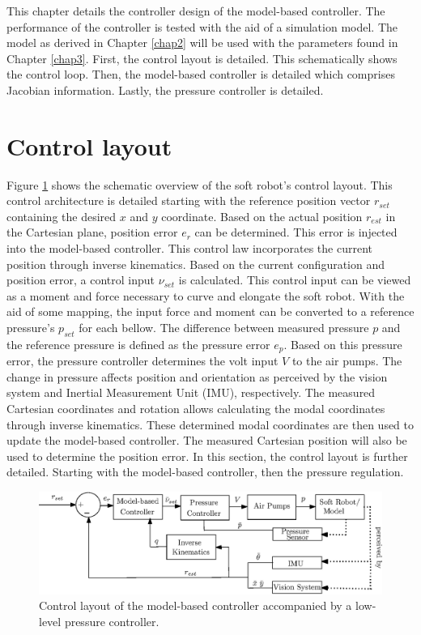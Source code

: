 \label{chap4}

This chapter details the controller design of the model-based controller. The performance of the controller is tested with the aid of a simulation model. The model as derived in Chapter \ref{chap2} will be used with the parameters found in Chapter \ref{chap3}. First, the control layout is detailed. This schematically shows the control loop. Then, the model-based controller is detailed which comprises Jacobian information. Lastly, the pressure controller is detailed. 



\section{Control layout}

Figure \ref{fig4:controllayout} shows the schematic overview of the soft robot's control layout. This control architecture is detailed starting with the reference position vector $r_{set}$ containing the desired $x$ and $y$ coordinate. Based on the actual position $r_{est}$ in the Cartesian plane, position error $e_r$ can be determined. This error is injected into the model-based controller. This control law incorporates the current position through inverse kinematics. Based on the current configuration and position error, a control input $\nu_{set}$ is calculated. This control input can be viewed as a moment and force necessary to curve and elongate the soft robot. With the aid of some mapping, the input force and moment can be converted to a reference pressure's $p_{set}$ for each bellow. The difference between measured pressure $p$ and the reference pressure is defined as the pressure error $e_p$. Based on this pressure error, the pressure controller determines the volt input $V$ to the air pumps. The change in pressure affects position and orientation as perceived by the vision system and Inertial Measurement Unit (IMU), respectively. The measured Cartesian coordinates and rotation allows calculating the modal coordinates through inverse kinematics. These determined modal coordinates are then used to update the model-based controller. The measured Cartesian position will also be used to determine the position error. In this section, the control layout is further detailed. Starting with the model-based controller, then the pressure regulation.


\begin{figure}[H]
    \centering
    \includegraphics[width = \textwidth]{Figures/Chapter4/ControlschemeActualwithPump.eps}
    \caption{Control layout of the model-based controller accompanied by a low-level pressure controller.}
    \label{fig4:controllayout}
\end{figure}




